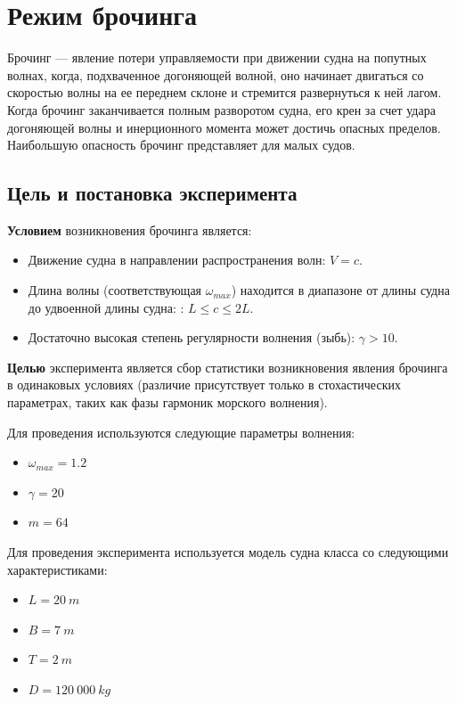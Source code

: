 \section{Режим брочинга}

Брочинг --- явление потери управляемости при движении судна на попутных волнах, когда, подхваченное догоняющей волной, оно начинает двигаться со скоростью волны на ее переднем склоне и стремится развернуться к ней лагом. Когда брочинг заканчивается полным разворотом судна, его крен за счет удара догоняющей волны и инерционного момента может достичь опасных пределов. Наибольшую опасность брочинг представляет для малых судов.

\subsection{Цель и постановка эксперимента}

\textbf{Условием} возникновения брочинга является:
\begin{itemize}
	\item	Движение судна в направлении распространения волн: $V=c$.
	\item	Длина волны (соответствующая $\omega_{max}$) находится в диапазоне от длины судна до удвоенной длины судна:
			: $L \leqslant c \leqslant 2L$.
	\item	Достаточно высокая степень регулярности волнения (зыбь): $\gamma > 10$.
\end{itemize}

\textbf{Целью} эксперимента является сбор статистики возникновения явления брочинга в одинаковых условиях (различие присутствует только в стохастических параметрах, таких как фазы гармоник морского волнения).

Для проведения используются следующие параметры волнения:
\begin{itemize}
	\item	$\omega_{max} = 1.2$
	\item	$\gamma = 20$
	\item	$m = 64$
\end{itemize}

Для проведения эксперимента используется модель судна класса  со следующими характеристиками:
\begin{itemize}
	\item	$L = 20\ m$
	\item	$B = 7\ m$
	\item	$T = 2\ m$
	\item	$D = 120\ 000\ kg$
\end{itemize}

